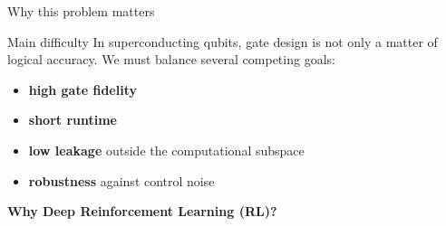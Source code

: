 \documentclass{beamer}
\begin{document}
\begin{frame}{Why this problem matters}
    \small 

    \begin{block}{Main difficulty}
    In superconducting qubits, gate design is not only a matter of logical accuracy. We must balance several competing goals:
    
    {\centering
    \begin{itemize}
        \item \textbf{high gate fidelity}
        \item \textbf{short runtime}
        \item \textbf{low leakage} outside the computational subspace
        \item \textbf{robustness} against control noise
    \end{itemize}
    }
\end{block}


\vspace{3em}
\centering
\textbf{\Large Why Deep Reinforcement Learning (RL)?}
\let\thefootnote\relax{}
\end{frame}
\end{document}
